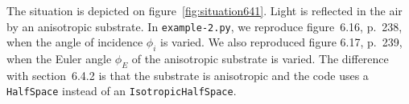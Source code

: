 The situation is depicted on figure~\ref{fig:situation641}.
Light is reflected in the air by an anisotropic substrate. 
In \verb/example-2.py/, we reproduce figure~6.16, p.~238, when the angle of incidence $\phi_i$ is varied.
We also reproduced figure 6.17, p.~239, when the Euler angle $\phi_E$ of the anisotropic substrate is varied.
The difference with section~6.4.2 is that the substrate is anisotropic and the code uses a \verb/HalfSpace/ instead of an \verb/IsotropicHalfSpace/.



